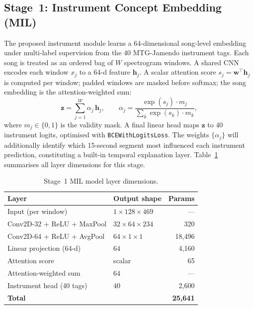 \documentclass[sigconf,nonacm]{acmart}
\begin{document}
\subsection{Stage~1: Instrument Concept Embedding (MIL)}

The proposed instrument module learns a 64-dimensional song-level embedding under multi-label
supervision from the 40 MTG-Jamendo instrument tags. Each song is treated as an ordered bag of
$W$ spectrogram windows. A shared CNN encodes each window $x_j$ to a 64-d feature $\mathbf{h}_j$.
A scalar attention score $s_j=\mathbf{w}^{\!\top}\mathbf{h}_j$ is computed per window; padded
windows are masked before softmax; the song embedding is the attention-weighted sum:
\begin{equation}
  \mathbf{z} = \sum_{j=1}^{W} \alpha_j\,\mathbf{h}_j,\qquad
  \alpha_j = \frac{\exp(s_j)\cdot m_j}{\sum_{k}\exp(s_k)\cdot m_k},
\end{equation}
where $m_j\in\{0,1\}$ is the validity mask. A final linear head maps $\mathbf{z}$ to 40
instrument logits, optimised with \texttt{BCEWithLogitsLoss}. The weights $\{\alpha_j\}$ will
additionally identify which 15-second segment most influenced each instrument prediction,
constituting a built-in temporal explanation layer. Table~\ref{tab:arch} summarises all layer dimensions for this stage.

\begin{table}[h]
  \caption{Stage~1 MIL model layer dimensions.}
  \label{tab:arch}
  \begin{tabular}{llr}
    \toprule
    Layer & Output shape & Params \\
    \midrule
    Input (per window)           & $1\!\times\!128\!\times\!469$ & --- \\
    Conv2D-32 + ReLU + MaxPool   & $32\!\times\!64\!\times\!234$ & 320 \\
    Conv2D-64 + ReLU + AvgPool   & $64\!\times\!1\!\times\!1$    & 18,496 \\
    Linear projection (64-d)     & $64$                          & 4,160 \\
    Attention score              & scalar                        & 65 \\
    Attention-weighted sum       & $64$                          & --- \\
    Instrument head (40 tags)    & $40$                          & 2,600 \\
    \midrule
    \textbf{Total}               &                               & \textbf{25,641} \\
    \bottomrule
  \end{tabular}
\end{table}
\end{document}
